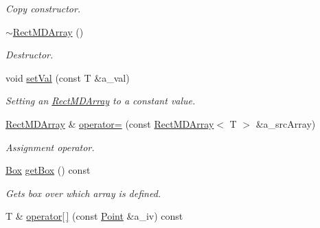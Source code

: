 \begin{DoxyCompactItemize}
\begin{DoxyCompactList}\small\item\em Copy constructor. \end{DoxyCompactList}\item 
\hypertarget{classRectMDArray_a098d6879255ce1fe43fe03c1f8460a6b}{}\hyperlink{classRectMDArray_a098d6879255ce1fe43fe03c1f8460a6b}{$\sim$\+Rect\+M\+D\+Array} ()\label{classRectMDArray_a098d6879255ce1fe43fe03c1f8460a6b}

\begin{DoxyCompactList}\small\item\em Destructor. \end{DoxyCompactList}\item 
\hypertarget{classRectMDArray_a3e18c24dc02c6354f201a8261493d248}{}void \hyperlink{classRectMDArray_a3e18c24dc02c6354f201a8261493d248}{set\+Val} (const T \&a\+\_\+val)\label{classRectMDArray_a3e18c24dc02c6354f201a8261493d248}

\begin{DoxyCompactList}\small\item\em Setting an \hyperlink{classRectMDArray}{Rect\+M\+D\+Array} to a constant value. \end{DoxyCompactList}\item 
\hypertarget{classRectMDArray_a5ab74c7822c98485daf7c974e5149c91}{}\hyperlink{classRectMDArray}{Rect\+M\+D\+Array} \& \hyperlink{classRectMDArray_a5ab74c7822c98485daf7c974e5149c91}{operator=} (const \hyperlink{classRectMDArray}{Rect\+M\+D\+Array}$<$ T $>$ \&a\+\_\+src\+Array)\label{classRectMDArray_a5ab74c7822c98485daf7c974e5149c91}

\begin{DoxyCompactList}\small\item\em Assignment operator. \end{DoxyCompactList}\item 
\hypertarget{classRectMDArray_a25ab8a23bb0791906bd9f69adffaf257}{}\hyperlink{classBox}{Box} \hyperlink{classRectMDArray_a25ab8a23bb0791906bd9f69adffaf257}{get\+Box} () const \label{classRectMDArray_a25ab8a23bb0791906bd9f69adffaf257}

\begin{DoxyCompactList}\small\item\em Gets box over which array is defined. \end{DoxyCompactList}\item 
\hypertarget{classRectMDArray_acb19cbfddee6a5a1610e49bbb6deed9e}{}T \& \hyperlink{classRectMDArray_acb19cbfddee6a5a1610e49bbb6deed9e}{operator\mbox{[}$\,$\mbox{]}} (const \hyperlink{classPoint}{Point} \&a\+\_\+iv) const \label{classRectMDArray_acb19cbfddee6a5a1610e49bbb6deed9e}


\end{DoxyCompactItemize}
